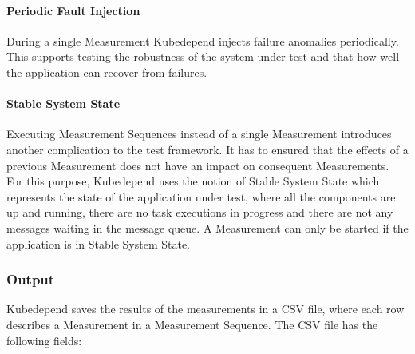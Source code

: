 


\paragraph{Periodic Fault Injection} During a single Measurement Kubedepend injects failure anomalies periodically. This supports testing the robustness of the system under test and that how well the application can recover from failures.

\paragraph{Stable System State} Executing Measurement Sequences instead of a single Measurement introduces another complication to the test framework. It has to ensured that the effects of a previous Measurement does not have an impact on consequent Measurements. For this purpose, Kubedepend uses the notion of Stable System State which represents the state of the application under test, where all the components are up and running, there are no task executions in progress and there are not any messages waiting in the message queue. A Measurement can only be started if the application is in Stable System State.

\subsubsection{Output} \label{test-impl-kubedepend-output}

Kubedepend saves the results of the measurements in a CSV file, where each row describes a Measurement in a Measurement Sequence. The CSV file has the following fields:

